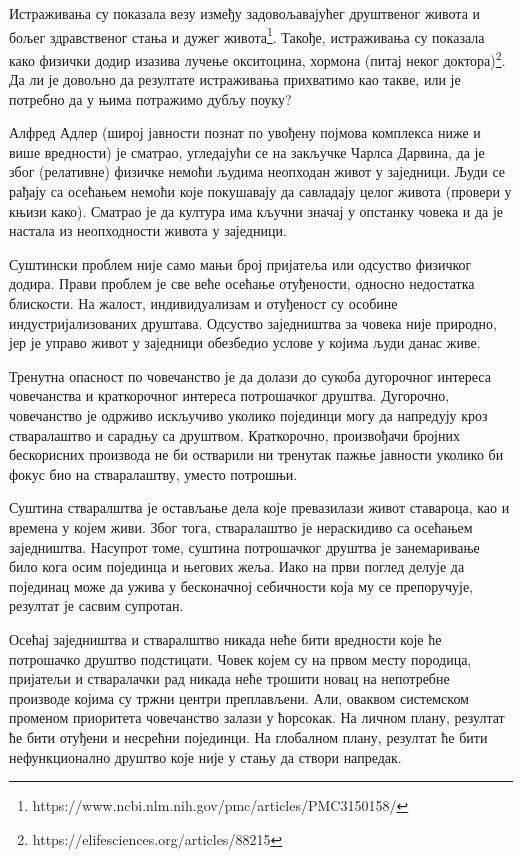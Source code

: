 \documentclass[b5paper]{article}
\begin{document}
Истраживања су показала везу између задовољавајућег друштвеног живота и бољег здравственог стања и дужег живота\footnote{https://www.ncbi.nlm.nih.gov/pmc/articles/PMC3150158/}. Такође, истраживања су показала како физички додир изазива лучење окситоцина, хормона (питај неког доктора)\footnote{https://elifesciences.org/articles/88215}. Да ли је довољно да резултате истраживања прихватимо као такве, или је потребно да у њима потражимо дубљу поуку?

Алфред Адлер (широј јавности познат по увођену појмова комплекса ниже и више вредности) је сматрао, угледајући се на закључке Чарлса Дарвина, да је због (релативне) физичке немоћи људима неопходан живот у заједници. Људи се рађају са осећањем немоћи које покушавају да савладају целог живота (провери у књизи како). Сматрао је да култура има кључни значај у опстанку човека и да је настала из неопходности живота у заједници.

Суштински проблем није само мањи број пријатеља или одсуство физичког додира. Прави проблем је све веће осећање отуђености, односно недостатка блискости. На жалост, индивидуализам и отуђеност су особине индустријализованих друштава. Одсуство заједништва за човека није природно, јер је управо живот у заједници обезбедио услове у којима људи данас живе.

Тренутна опасност по човечанство је да долази до сукоба дугорочног интереса човечанства и краткорочног интереса потрошачког друштва. Дугорочно, човечанство је одрживо искључиво уколико појединци могу да напредују кроз стваралаштво и сарадњу са друштвом. Краткорочно, произвођачи бројних бескорисних производа не би остварили ни тренутак пажње јавности уколико би фокус био на стваралаштву, уместо потрошњи.

Суштина стваралштва је остављање дела које превазилази живот ставароца, као и времена у којем живи. Због тога, стваралаштво је нераскидиво са осећањем заједништва. Насупрот томе, суштина потрошачког друштва је занемаривање било кога осим појединца и његових жеља. Иако на први поглед делује да појединац може да ужива у бесконачној себичности која му се препоручује, резултат је сасвим супротан.

Осећај заједништва и стваралштво никада неће бити вредности које ће потрошачко друштво подстицати. Човек којем су на првом месту породица, пријатељи и стваралачки рад никада неће трошити новац на непотребне производе којима су тржни центри преплављени. Али, оваквом системском променом приоритета човечанство залази у ћорсокак. На личном плану, резултат ће бити отуђени и несрећни појединци. На глобалном плану, резултат ће бити нефункционално друштво које није у стању да створи напредак.
\end{document}
